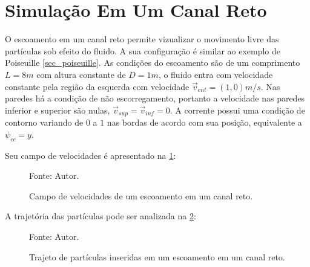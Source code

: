 \section{\textbf{Simulação Em Um Canal Reto}}
\label{sec_channel}
O escoamento em um canal reto permite vizualizar o movimento livre das partículas sob efeito do fluido.
A sua configuração é similar ao exemplo de Poiseuille \ref{sec_poiseuille}.
As condições do escoamento são de um comprimento $L=8m$ com altura constante de $D=1m$, o fluido entra com velocidade constante pela região da esquerda com velocidade $\vec{v}_{ent}=(1, 0)m/s$.
Nas paredes há a condição de não escorregamento, portanto a velocidade nas paredes inferior e superior são nulas, $\vec{v}_{sup}=\vec{v}_{inf}=0$.
A corrente possui uma condição de contorno variando de $0$ a $1$ nas bordas de acordo com sua posição, equivalente a $\psi_{cc}=y$.

Seu campo de velocidades é apresentado na \ref{channel_result}:
\begin{figure}[H]
    \centering
     {\raggedleft \scriptsize Fonte: Autor.}
    \caption{Campo de velocidades de um escoamento em um canal reto.}
    \label{channel_result}
\end{figure}

A trajetória das partículas pode ser analizada na \ref{channel_trajectory}:
\begin{figure}[H]
    \centering
     {\raggedleft \scriptsize Fonte: Autor.}
    \caption{Trajeto de partículas inseridas em um escoamento em um canal reto.}
    \label{channel_trajectory}
\end{figure}

